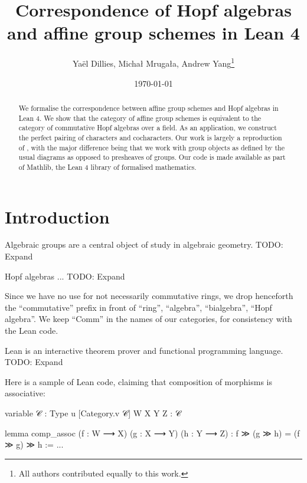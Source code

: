 \documentclass{article}
\title{Correspondence of Hopf algebras and affine group schemes in Lean 4}
\author{Yaël Dillies, Michał Mrugała, Andrew Yang\footnote{All authors contributed equally to this work.}}
\date{\today}
\begin{document}
\maketitle


\begin{abstract}
  We formalise the correspondence between affine group schemes and Hopf algebras in Lean 4.
  We show that the category of affine group schemes is equivalent to the category of commutative Hopf algebras over a field.
  As an application, we construct the perfect pairing of characters and cocharacters.
  Our work is largely a reproduction of \cite{CrazyAffine}, with the major difference being that we work with group objects as defined by the usual diagrams as opposed to presheaves of groups.
  Our code is made available as part of Mathlib, the Lean 4 library of formalised mathematics.
\end{abstract}


\section{Introduction}\label{sec:intro}


Algebraic groups are a central object of study in algebraic geometry. TODO: Expand

Hopf algebras ... TODO: Expand

Since we have no use for not necessarily commutative rings, we drop henceforth the ``commutative'' prefix in front of ``ring'', ``algebra'', ``bialgebra'', ``Hopf algebra''.
We keep ``Comm'' in the names of our categories, for consistency with the Lean code.

Lean is an interactive theorem prover and functional programming language. TODO: Expand

Here is a sample of Lean code, claiming that composition of morphisms is associative:
\begin{leancode}
  variable {𝒞 : Type u} [Category.{v} 𝒞] {W X Y Z : 𝒞}

  lemma comp_assoc (f : W ⟶ X) (g : X ⟶ Y) (h : Y ⟶ Z) : f ≫ (g ≫ h) = (f ≫ g) ≫ h := ...
\end{leancode}
\end{document}
